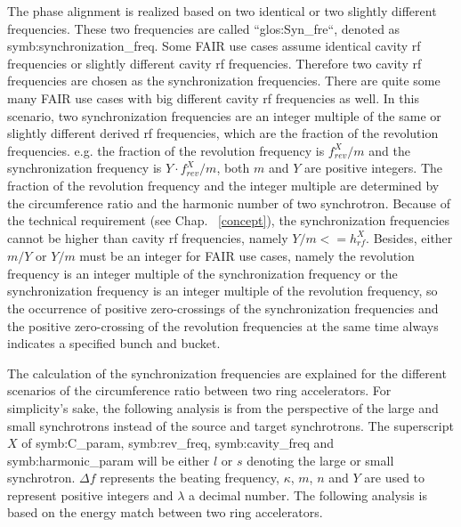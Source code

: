 The phase alignment is realized based on two identical or two slightly different frequencies. These two frequencies are called ``\gls{glos:Syn_fre}``, denoted as \gls{symb:synchronization_freq}. Some FAIR use cases assume identical cavity rf frequencies or slightly different cavity rf frequencies. Therefore two cavity rf frequencies are chosen as the synchronization frequencies. There are quite some many FAIR use cases with big different cavity rf frequencies as well. In this scenario, two synchronization frequencies are an integer multiple of the same or slightly different derived rf frequencies, which are the fraction of the revolution frequencies. e.g. the fraction of the revolution frequency is $f_\mathit{rev}^{X}/m$ and the synchronization frequency is $Y\cdot f_\mathit{rev}^{X}/m$, both $m$ and $Y$ are positive integers. The fraction of the revolution frequency and the integer multiple are determined by the circumference ratio and the harmonic number of two synchrotron. Because of the technical requirement (see Chap. ~\ref{concept}), the synchronization frequencies cannot be higher than cavity rf frequencies, namely $Y/m <=h^X_\mathit{rf}$. Besides, either $m/Y$ or $Y/m$ must be an integer for FAIR use cases, namely the revolution frequency is an integer multiple of the synchronization frequency or the synchronization frequency is an integer multiple of the revolution frequency, so the occurrence of positive zero-crossings of the synchronization frequencies and the positive zero-crossing of the revolution frequencies at the same time always indicates a specified bunch and bucket.

The calculation of the synchronization frequencies are explained for the different scenarios of the circumference ratio between two ring accelerators. For simplicity's sake, the following analysis is from the perspective of the large and small synchrotrons instead of the source and target synchrotrons. The superscript $X$ of \gls{symb:C_param}, \gls{symb:rev_freq}, \gls{symb:cavity_freq} and \gls{symb:harmonic_param} will be either $l$ or $s$ denoting the large or small synchrotron. $\Delta f$ represents the beating frequency, $\kappa$, $m$, $n$ and $Y$ are used to represent positive integers and $\lambda$ a decimal number. The following analysis is based on the energy match between two ring accelerators.

